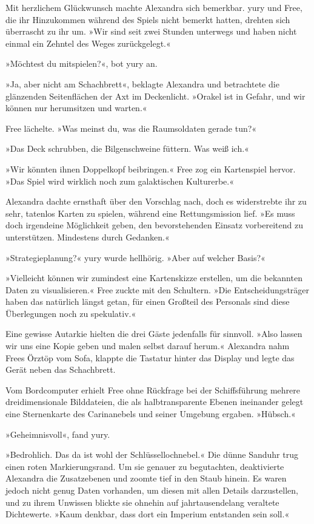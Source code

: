 Mit herzlichem Glückwunsch machte Alexandra sich bemerkbar. yury und Free, die ihr Hinzukommen während des Spiels nicht bemerkt hatten, drehten sich überrascht zu ihr um. »Wir sind seit zwei Stunden unterwegs und haben nicht einmal ein Zehntel des Weges zurückgelegt.«

»Möchtest du mitspielen?«, bot yury an.

»Ja, aber nicht am Schachbrett«, beklagte Alexandra und betrachtete die glänzenden Seitenflächen der Axt im Deckenlicht. »Orakel ist in Gefahr, und wir können nur herumsitzen und warten.«

Free lächelte. »Was meinst du, was die Raumsoldaten gerade tun?«

»Das Deck schrubben, die Bilgenschweine füttern. Was weiß ich.«

»Wir könnten ihnen Doppelkopf beibringen.« Free zog ein Kartenspiel hervor. »Das Spiel wird wirklich noch zum galaktischen Kulturerbe.«

Alexandra dachte ernsthaft über den Vorschlag nach, doch es widerstrebte ihr zu sehr, tatenlos Karten zu spielen, während eine Rettungsmission lief. »Es muss doch irgendeine Möglichkeit geben, den bevorstehenden Einsatz vorbereitend zu unterstützen. Mindestens durch Gedanken.«

»Strategieplanung?« yury wurde hellhörig. »Aber auf welcher Basis?«

»Vielleicht können wir zumindest eine Kartenskizze erstellen, um die bekannten Daten zu visualisieren.« Free zuckte mit den Schultern. »Die Entscheidungsträger haben das natürlich längst getan, für einen Großteil des Personals sind diese Überlegungen noch zu spekulativ.«

Eine gewisse Autarkie hielten die drei Gäste jedenfalls für sinnvoll. »Also lassen wir uns eine Kopie geben und malen selbst darauf herum.« Alexandra nahm Frees Örztöp vom Sofa, klappte die Tastatur hinter das Display und legte das Gerät neben das Schachbrett.

Vom Bordcomputer erhielt Free ohne Rückfrage bei der Schiffsführung mehrere dreidimensionale Bilddateien, die als halbtransparente Ebenen ineinander gelegt eine Sternenkarte des Carinanebels und seiner Umgebung ergaben. »Hübsch.«

»Geheimnisvoll«, fand yury.

»Bedrohlich. Das da ist wohl der Schlüssellochnebel.« Die dünne Sanduhr trug einen roten Markierungsrand. Um sie genauer zu begutachten, deaktivierte Alexandra die Zusatzebenen und zoomte tief in den Staub hinein. Es waren jedoch nicht genug Daten vorhanden, um diesen mit allen Details darzustellen, und zu ihrem Unwissen blickte sie ohnehin auf jahrtausendelang veraltete Dichtewerte. »Kaum denkbar, dass dort ein Imperium entstanden sein soll.«


